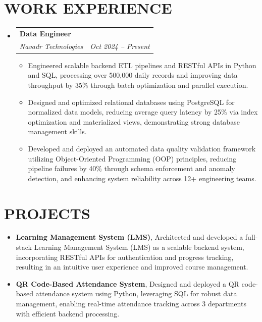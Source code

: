 \documentclass[letterpaper,11pt]{article}
\makeatletter
\newcommand{\resumeItem}[1]{\item\small{{#1 \vspace{-1pt}}}}
\newcommand{\resumeSubheading}[4]{\vspace{-2pt}\item\begin{tabular*}{1.0\textwidth}[t]{l@{\extracolsep{\fill}}r}\textbf{\large#1} & \textbf{\small #2} \\\textit{\large#3} & \textit{\small #4} \\\end{tabular*}\vspace{-7pt}}
\newcommand{\resumeSubHeadingListStart}{\begin{itemize}[leftmargin=0.0in, label={}]}
\newcommand{\resumeSubHeadingListEnd}{\end{itemize}}
\newcommand{\resumeItemListStart}{\begin{itemize}[leftmargin=0.1in]}
\newcommand{\resumeItemListEnd}{\end{itemize}\vspace{-5pt}}
\makeatother
\begin{document}
\section{\color{airforceblue}WORK EXPERIENCE}
  \resumeSubHeadingListStart
    
    \resumeSubheading{Data Engineer}{}{Navadr Technologies}{Oct 2024 – Present}
      \resumeItemListStart
        
        \resumeItem{\normalsize{Engineered scalable backend ETL pipelines and RESTful APIs in Python and SQL, processing over 500,000 daily records and improving data throughput by 35\% through batch optimization and parallel execution.}}
        
        \resumeItem{\normalsize{Designed and optimized relational databases using PostgreSQL for normalized data models, reducing average query latency by 25\% via index optimization and materialized views, demonstrating strong database management skills.}}
        
        \resumeItem{\normalsize{Developed and deployed an automated data quality validation framework utilizing Object-Oriented Programming (OOP) principles, reducing pipeline failures by 40\% through schema enforcement and anomaly detection, and enhancing system reliability across 12+ engineering teams.}}
        
      \resumeItemListEnd  
    
  \resumeSubHeadingListEnd

\section{\color{airforceblue}PROJECTS}    
    \resumeItemListStart
        
        \resumeItem{\normalsize{\textbf{Learning Management System (LMS)}, Architected and developed a full-stack Learning Management System (LMS) as a scalable backend system, incorporating RESTful APIs for authentication and progress tracking, resulting in an intuitive user experience and improved course management.}}
        
        \resumeItem{\normalsize{\textbf{QR Code-Based Attendance System}, Designed and deployed a QR code-based attendance system using Python, leveraging SQL for robust data management, enabling real-time attendance tracking across 3 departments with efficient backend processing.}}
        
    \resumeItemListEnd   
\end{document}
